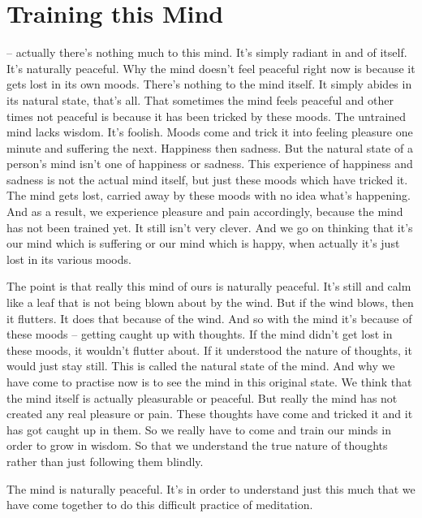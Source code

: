 

\chapter{Training this Mind}

 -- actually there's nothing much to this mind. It's simply radiant in and of itself. It's naturally peaceful. Why the mind doesn't feel peaceful right now is because it gets lost in its own moods. There's nothing to the mind itself. It simply abides in its natural state, that's all. That sometimes the mind feels peaceful and other times not peaceful is because it has been tricked by these moods. The untrained mind lacks wisdom. It's foolish. Moods come and trick it into feeling pleasure one minute and suffering the next. Happiness then sadness. But the natural state of a person's mind isn't one of happiness or sadness. This experience of happiness and sadness is not the actual mind itself, but just these moods which have tricked it. The mind gets lost, carried away by these moods with no idea what's happening. And as a result, we experience pleasure and pain accordingly, because the mind has not been trained yet. It still isn't very clever. And we go on thinking that it's our mind which is suffering or our mind which is happy, when actually it's just lost in its various moods. 

The point is that really this mind of ours is naturally peaceful. It's still and calm like a leaf that is not being blown about by the wind. But if the wind blows, then it flutters. It does that because of the wind. And so with the mind it's because of these moods -- getting caught up with thoughts. If the mind didn't get lost in these moods, it wouldn't flutter about. If it understood the nature of thoughts, it would just stay still. This is called the natural state of the mind. And why we have come to practise now is to see the mind in this original state. We think that the mind itself is actually pleasurable or peaceful. But really the mind has not created any real pleasure or pain. These thoughts have come and tricked it and it has got caught up in them. So we really have to come and train our minds in order to grow in wisdom. So that we understand the true nature of thoughts rather than just following them blindly.

The mind is naturally peaceful. It's in order to understand just this much that we have come together to do this difficult practice of meditation.


